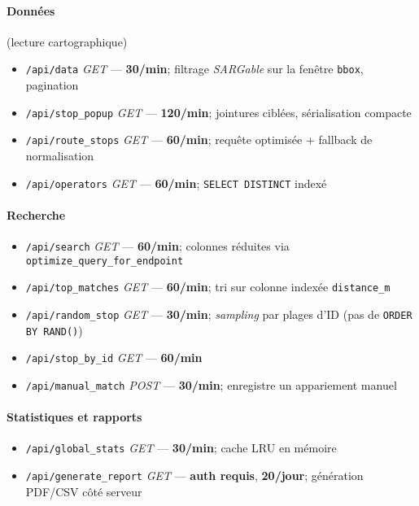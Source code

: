 \paragraph{Données} (lecture cartographique)
\begin{itemize}
  \item \texttt{/api/data} \textit{GET} — \textbf{30/min}; filtrage \emph{SARGable} sur la fenêtre \texttt{bbox}, pagination
  \item \texttt{/api/stop\_popup} \textit{GET} — \textbf{120/min}; jointures ciblées, sérialisation compacte
  \item \texttt{/api/route\_stops} \textit{GET} — \textbf{60/min}; requête optimisée + fallback de normalisation
  \item \texttt{/api/operators} \textit{GET} — \textbf{60/min}; \texttt{SELECT DISTINCT} indexé
\end{itemize}

\paragraph{Recherche}
\begin{itemize}
  \item \texttt{/api/search} \textit{GET} — \textbf{60/min}; colonnes réduites via \texttt{optimize\_query\_for\_endpoint}
  \item \texttt{/api/top\_matches} \textit{GET} — \textbf{60/min}; tri sur colonne indexée \texttt{distance\_m}
  \item \texttt{/api/random\_stop} \textit{GET} — \textbf{30/min}; \emph{sampling} par plages d'ID (pas de \texttt{ORDER BY RAND()})
  \item \texttt{/api/stop\_by\_id} \textit{GET} — \textbf{60/min}
  \item \texttt{/api/manual\_match} \textit{POST} — \textbf{30/min}; enregistre un appariement manuel
\end{itemize}

\paragraph{Statistiques et rapports}
\begin{itemize}
  \item \texttt{/api/global\_stats} \textit{GET} — \textbf{30/min}; cache LRU en mémoire
  \item \texttt{/api/generate\_report} \textit{GET} — \textbf{auth requis}, \textbf{20/jour}; génération PDF/CSV côté serveur
\end{itemize}

